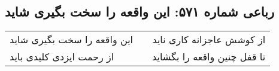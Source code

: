 \begin{center}
\section*{رباعی شماره ۵۷۱: این واقعه را سخت بگیری شاید}
\label{sec:0571}
\begin{longtable}{l p{0.5cm} r}
این واقعه را سخت بگیری شاید
&&
از کوشش عاجزانه کاری ناید
\\
از رحمت ایزدی کلیدی باید
&&
تا قفل چنین واقعه را بگشاید
\\
\end{longtable}
\end{center}
